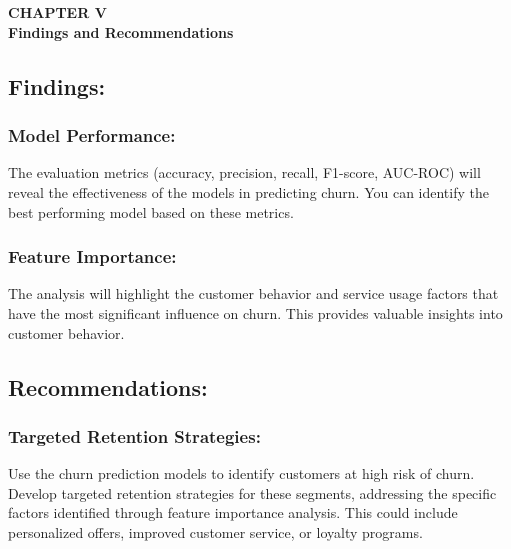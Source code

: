 \section*{}
\begin{center}
    {\fontsize{14}{1.5}\selectfont \textbf{CHAPTER V}}\\
    \vspace{12pt}
    {\fontsize{16}{1.5}\selectfont \textbf{Findings and Recommendations}}\\
    \vspace{12pt}
    \vspace{12pt}
\end{center}

\setcounter{section}{5}
\setcounter{subsection}{0}

\subsection{Findings:}

    \subsubsection{Model Performance:} The evaluation metrics (accuracy, precision, recall, F1-score, AUC-ROC) will reveal the effectiveness of the models in predicting churn. You can identify the best performing model based on these metrics.
    \subsubsection{Feature Importance:} The analysis will highlight the customer behavior and service usage factors that have the most significant influence on churn. This provides valuable insights into customer behavior.

\subsection{Recommendations:}

    \subsubsection{Targeted Retention Strategies:} Use the churn prediction models to identify customers at high risk of churn. Develop targeted retention strategies for these segments, addressing the specific factors identified through feature importance analysis. This could include personalized offers, improved customer service, or loyalty programs.
